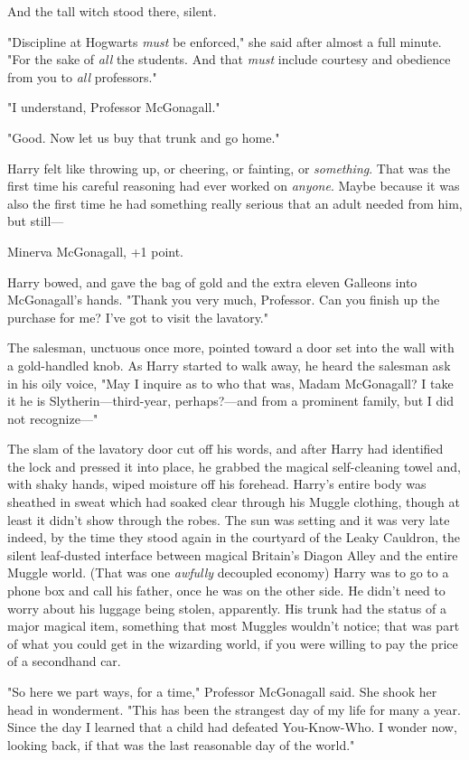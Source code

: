 And the tall witch stood there, silent.

"Discipline at Hogwarts \emph{must} be enforced," she said after almost a full
minute. "For the sake of \emph{all} the students. And that \emph{must} include
courtesy and obedience from you to \emph{all} professors."

"I understand, Professor McGonagall."

"Good. Now let us buy that trunk and go home."

Harry felt like throwing up, or cheering, or fainting, or \emph{something}.
That was the first time his careful reasoning had ever worked on \emph{anyone}.
Maybe because it was also the first time he had something really serious that
an adult needed from him, but still—

Minerva McGonagall, +1 point.

Harry bowed, and gave the bag of gold and the extra eleven Galleons into
McGonagall's hands. "Thank you very much, Professor. Can you finish up the
purchase for me? I've got to visit the lavatory."

The salesman, unctuous once more, pointed toward a door set into the wall with
a gold-handled knob. As Harry started to walk away, he heard the salesman ask
in his oily voice, "May I inquire as to who that was, Madam McGonagall? I take
it he is Slytherin—third-year, perhaps?—and from a prominent family, but I
did not recognize—"

The slam of the lavatory door cut off his words, and after Harry had identified
the lock and pressed it into place, he grabbed the magical self-cleaning towel
and, with shaky hands, wiped moisture off his forehead. Harry's entire body was
sheathed in sweat which had soaked clear through his Muggle clothing, though at
least it didn't show through the robes.
\sbreak
The sun was setting and it was very late indeed, by the time they stood again
in the courtyard of the Leaky Cauldron, the silent leaf-dusted interface
between magical Britain's Diagon Alley and the entire Muggle world. (That was
one \emph{awfully} decoupled economy{\el}) Harry was to go to a phone box
and call his father, once he was on the other side. He didn't need to worry
about his luggage being stolen, apparently. His trunk had the status of a major
magical item, something that most Muggles wouldn't notice; that was part of
what you could get in the wizarding world, if you were willing to pay the price
of a secondhand car.

"So here we part ways, for a time," Professor McGonagall said. She shook her
head in wonderment. "This has been the strangest day of my life for{\el}
many a year. Since the day I learned that a child had defeated You-Know-Who. I
wonder now, looking back, if that was the last reasonable day of the world."

